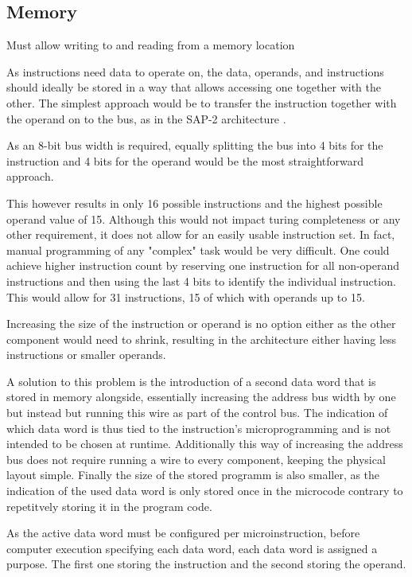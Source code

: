 \subsection{Memory}

\begin{turing-requirement}
Must allow writing to and reading from a memory location
\end{turing-requirement}

As instructions need data to operate on, the data, operands, and instructions should ideally be stored in a way that allows accessing one together with the other. The simplest approach would be to transfer the instruction together with the operand on to the bus, as in the SAP-2 architecture \cite{malvino1983a}.

As an 8-bit bus width is required, equally splitting the bus into 4 bits for the instruction and 4 bits for the operand would be the most straightforward approach.

This however results in only 16 possible instructions and the highest possible operand value of 15. Although this would not impact turing completeness or any other requirement, it does not allow for an easily usable instruction set. In fact, manual programming of any "complex" task would be very difficult. One could achieve higher instruction count by reserving one instruction for all non-operand instructions and then using the last 4 bits to identify the individual instruction. This would allow for 31 instructions, 15 of which with operands up to 15.

Increasing the size of the instruction or operand is no option either as the other component would need to shrink, resulting in the architecture either having less instructions or smaller operands.

A solution to this problem is the introduction of a second data word that is stored in memory alongside, essentially increasing the address bus width by one but instead but running this wire as part of the control bus. The indication of which data word is thus tied to the instruction's microprogramming and is not intended to be chosen at runtime. Additionally this way of increasing the address bus does not require running a wire to every component, keeping the physical layout simple. Finally the size of the stored programm is also smaller, as the indication of the used data word is only stored once in the microcode contrary to repetitvely storing it in the program code.  

As the active data word must be configured per microinstruction, before computer execution specifying each data word, each data word is assigned a purpose. The first one storing the instruction and the second storing the operand.    

